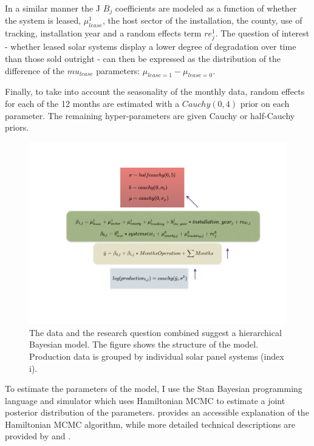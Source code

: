 \documentclass[12pt]{article}
\begin{document}
In a similar manner the J $B_j$ coefficients are modeled as a function of whether the system is leased, $\mu_{lease}^1$, the host sector of the installation, the county, use of tracking, installation year and a random effects term $re^1_j$.  The question of interest - whether leased solar systems display a lower degree of degradation over time than those sold outright - can then be expressed as the distribution of the difference of the $mu_{lease}$ parameters: $\mu_{lease=1} - \mu_{lease=0}$.

Finally, to take into account the seasonality of the monthly data, random effects for each of the 12 months are estimated with a $Cauchy(0,4)$ prior on each parameter. The remaining hyper-parameters are given Cauchy or half-Cauchy priors.

\begin{figure}
	\includegraphics[width=1\textwidth]{figures/solar_prod_bayes_diag.png}
	\caption{The data and the research question combined suggest a hierarchical Bayesian model. The figure shows the structure of the model. Production data is grouped by individual solar panel systems (index i).}
	\label{solar_prod_bayes_diag}
\end{figure}

To estimate the parameters of the model, I use the Stan Bayesian programming language and simulator \citep{stan_development_team_stan_2014} which uses Hamiltonian MCMC to estimate a joint posterior distribution of the parameters. \citet{kruschke_doing_2014} provides an accessible explanation of the Hamiltonian MCMC algorithm, while more detailed technical descriptions are provided by \citet{gelman_bayesian_2013} and \citet{stan_development_team_stan_2014}.
\end{document}
